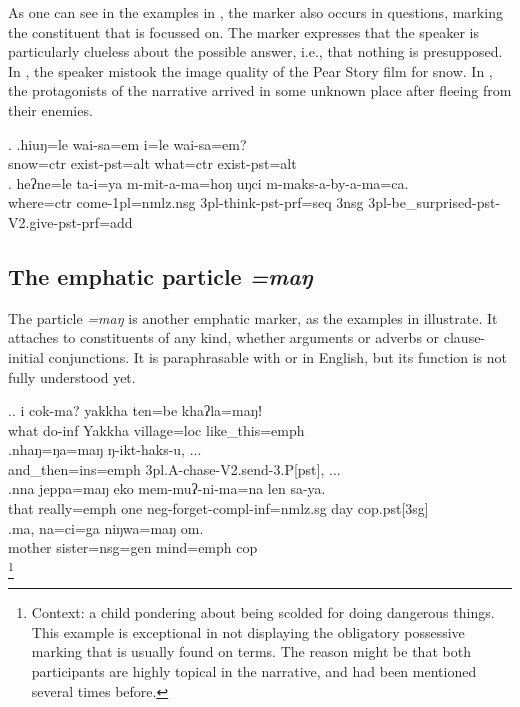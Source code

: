 As one can see in the examples in \Next, the marker also occurs in questions, marking the constituent that is focussed on. The marker expresses that the speaker is particularly clueless about the possible answer, i.e., that nothing is presupposed. In \Next[a], the speaker mistook the image quality of the Pear Story film \citep{Chafe1980The-Pear} for snow. In \Next[b], the protagonists of the narrative arrived in some unknown place after fleeing from their enemies. 
 
\ex. \ag.hiuŋ=le wai-sa=em  i=le wai-sa=em?\\
snow{\sc =ctr} exist{\sc [3sg]-pst=alt} what{\sc =ctr} exist{\sc [3sg]-pst=alt}\\
 
\bg. heʔne=le   ta-i=ya   m-mit-a-ma=hoŋ  uŋci m-maks-a-by-a-ma=ca.\\
where{\sc =ctr} come{\sc -1pl=nmlz.nsg} {\sc 3pl-}think{\sc -pst-prf=seq} {\sc 3nsg} {\sc 3pl-}be\_surprised{\sc -pst-V2.give-pst-prf=add}\\
 


\subsection{The emphatic particle \emph{=maŋ}}

 The particle \emph{=maŋ} is another emphatic marker, as the examples in \Next illustrate. It attaches to constituents of any kind, whether arguments or adverbs or clause-initial conjunctions. It is paraphrasable with  or  in English, but its  function is not fully understood yet.
 
\ex.\ag. i cok-ma? yakkha ten=be khaʔla=maŋǃ\\
what do{\sc -inf} Yakkha village{\sc =loc} like\_this{\sc =emph}\\
  \bg.nhaŋ=ŋa=maŋ ŋ-ikt-haks-u, ...\\
  and\_then{\sc =ins=emph} {\sc 3pl.A-}chase{\sc -V2.send-3.P[pst]}, ...\\
 \bg.nna  jeppa=maŋ   eko mem-muʔ-ni-ma=na                         len sa-ya.\\
that really{\sc =emph} one {\sc neg-}forget{\sc -compl-inf=nmlz.sg} day {\sc cop.pst[3sg]}\\
 
 \bg.ma,     na=ci=ga                 niŋwa=maŋ   om.\\
mother sister{\sc =nsg=gen} mind{\sc =emph} {\sc cop}\\
\footnote{Context: a child pondering about being scolded for doing dangerous things. This example is exceptional in not displaying the obligatory possessive marking that is usually found on  terms. The reason might be that both participants are highly topical in the narrative, and had been mentioned several times before.}  
 

